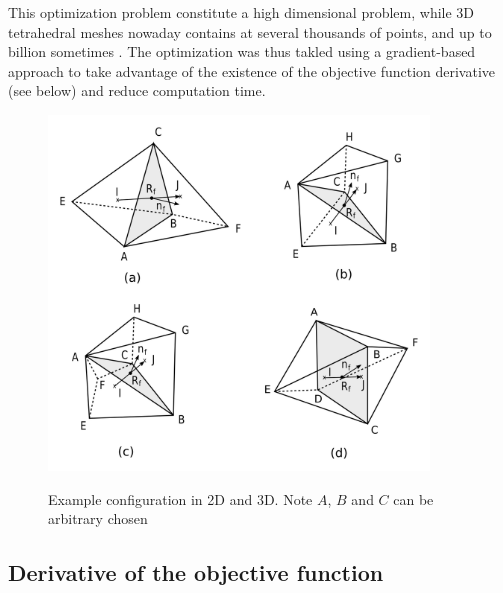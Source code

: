 \documentclass[11pt]{article}
\begin{document}
This optimization problem constitute a high dimensional problem, while 3D tetrahedral meshes nowaday contains at several thousands of points, and up to billion sometimes \cite{neau_massively_2020}.
The optimization was thus takled using a gradient-based approach to take advantage of the existence of the objective function derivative (see below) and reduce computation time.

\begin{figure}[h!]
  \centering
  \includegraphics[width=0.9\textwidth]{figures/cases.png}
  \label{cases_figure}
  \caption{Example configuration in 2D and 3D. Note $A$, $B$ and $C$ can be arbitrary chosen}
\end{figure}



\subsection{Derivative of the objective function}
\end{document}

